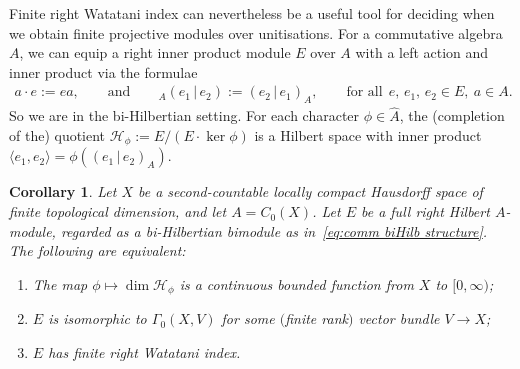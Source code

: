 \documentclass[10pt,a4paper]{amsart}
\numberwithin{equation}{section}
\newtheorem{corl}[thm]{Corollary}
 { \theoremstyle{definition}
\newtheorem{defn}[thm]{Definition}
\newtheorem{Example}[thm]{Example}
\newtheorem{rmk}[thm]{Remark}}
\renewcommand{\H}{\mathcal{H}} %
\begin{document}
Finite right Watatani index can nevertheless be a useful tool for deciding when we obtain f\/inite projective modules over unitisations. For a commutative algebra~$A$, we can equip a right inner product module $E$ over $A$ with a left action and inner product via the formulae
\begin{gather}\label{eq:comm biHilb structure}
a\cdot e:=ea,\qquad\mbox{and}\qquad {}_A(e_1 \,|\, e_2):=(e_2 \,|\, e_1)_A,\qquad\text{for all} \ \ e,\,e_1,\,e_2 \in E,\ a\in A.
\end{gather}
So we are in the bi-Hilbertian setting. For each character $\phi \in \widehat{A}$, the (completion of the) quotient $\H_\phi := E/(E \cdot \ker\phi)$ is a Hilbert space with inner product $\langle e_1,e_2\rangle = \phi((e_1\,|\, e_2)_A)$.

\begin{corl}\label{cor:VB2} Let $X$ be a second-countable locally compact Hausdorff space of finite topological dimension, and let $A=C_0(X)$. Let $E$ be a full right Hilbert $A$-module, regarded as a bi-Hilbertian bimodule as in~\eqref{eq:comm biHilb structure}. The following are equivalent:
\begin{enumerate}\itemsep=0pt
\item[$1)$] The map $\phi \mapsto \dim \H_\phi$ is a continuous bounded function from $X$ to $[0,\infty)$;
\item[$2)$] $E$ is isomorphic to $\Gamma_0(X,V)$ for some $($finite rank$)$ vector bundle $V\to X$;
\item[$3)$] $E$ has finite right Watatani index.
\end{enumerate}
\end{corl}
\end{document}
